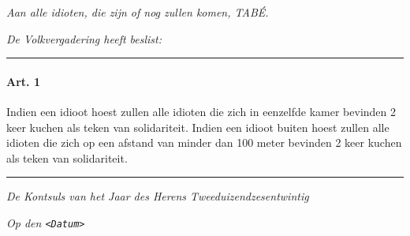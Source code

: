\emph{Aan alle idioten, die zijn of nog zullen komen, TABÉ.}

\emph{De Volkvergadering heeft beslist:}

\begin{center}\rule{0.5\linewidth}{0.5pt}\end{center}

\hypertarget{art.-1}{%
\paragraph{Art. 1}\label{art.-1}}

Indien een idioot hoest zullen alle idioten die zich in eenzelfde kamer
bevinden 2 keer kuchen als teken van solidariteit. Indien een idioot
buiten hoest zullen alle idioten die zich op een afstand van minder dan
100 meter bevinden 2 keer kuchen als teken van solidariteit.

\begin{center}\rule{0.5\linewidth}{0.5pt}\end{center}

\emph{De Kontsuls van het Jaar des Herens Tweeduizendzesentwintig}

\emph{Op den \texttt{\textless{}Datum\textgreater{}}}
